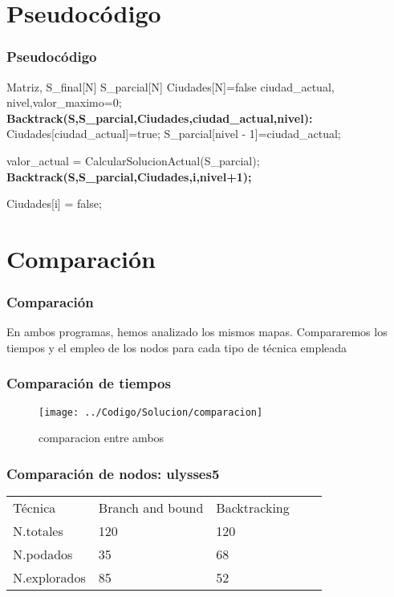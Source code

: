 \documentclass{beamer}
\begin{document}
\section{Pseudocódigo}
\begin{frame}
	\frametitle{Pseudocódigo}
	\footnotesize{	
		\begin{algorithmic}				
				\Require Matriz, S\_final[N] S\_parcial[N] Ciudades[N]={false} ciudad\_actual, nivel,valor\_maximo=0;
				\State \textbf{Backtrack(S,S\_parcial,Ciudades,ciudad\_actual,nivel):}
				\State Ciudades[ciudad\_actual]=true;
				\State	   S\_parcial[nivel - 1]=ciudad\_actual;
				
				\State 	valor\_actual = CalcularSolucionActual(S\_parcial);
				\State 	\textbf{Backtrack(S,S\_parcial,Ciudades,i,nivel+1);}
				\EndIf
				\EndIf
				\EndIf
				
				\State Ciudades[i] = false;
				\EndIf
				\EndFor
			\end{algorithmic}			
			}
		\end{frame}


\section{Comparación}
\begin{frame}
	\frametitle{Comparación}
	En ambos programas, hemos analizado los mismos mapas. Compararemos los tiempos y el empleo de los nodos para cada tipo de técnica empleada
\end{frame}


\begin{frame}
	\frametitle{Comparación de tiempos}
	\begin{figure}[H]
\centering
\texttt{[image: ../Codigo/Solucion/comparacion]}
\caption{comparacion entre ambos }
\label{fig:comparacion}
\end{figure}


\end{frame}


\begin{frame}
	\frametitle{Comparación de nodos: ulysses5}
	
	\begin{table}[]
		\centering
	
		\label{my-label}
		\begin{tabular}{lllll}
	Técnica	& Branch and bound & Backtracking  &   \\
	N.totales& 120&120  &  &  \\
	N.podados&  35& 68 &  &  \\
	N.explorados&85  &52  &  &  \\

		\end{tabular}
	\end{table}
	
\end{frame}
\end{document}
